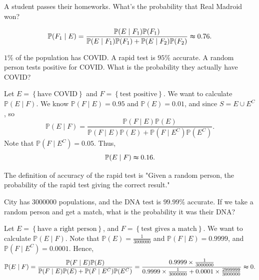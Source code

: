 \begin{eg}
    A student passes their homeworks. What's the probability that Real Madroid won?
\end{eg}
\begin{explanation}
    \begin{align*}
        \mathbb{P} (F_1 \mid E) = \frac{\mathbb{P} (E \mid F_1) \mathbb{P} (F_1)}{\mathbb{P} (E \mid F_1) \mathbb{P} (F_1) + \mathbb{P} (E \mid F_2) \mathbb{P} (F_2) } \thickapprox 0.76.
    \end{align*}
\end{explanation}

\begin{eg}
    \(1 \%\) of the population has COVID. A rapid test is \(95 \%\) accurate. A random person tests positive for COVID. What is the probability they actually have COVID?  
\end{eg}
\begin{explanation}
    Let \(E = \left\{ \text{have COVID}  \right\} \) and \(F = \left\{ \text{test positive}  \right\} \). We want to calculate \(\mathbb{P} (E \mid F)\). We know \(\mathbb{P} (F \mid E) = 0.95\) and \(\mathbb{P} (E) = 0.01\), and since \(S = E \cup E^C\), so 
    \[
        \mathbb{P} (E \mid F) = \frac{\mathbb{P} (F \mid E) \mathbb{P} (E)}{\mathbb{P} (F \mid E) \mathbb{P} (E) + \mathbb{P} (F \mid E^C) \mathbb{P} (E^C) }.
    \]       
    Note that \(\mathbb{P} (F \mid E^C) = 0.05\). Thus,
    \[
        \mathbb{P} (E \mid F) \thickapprox 0.16.
    \] 
\end{explanation}

\begin{remark}
    The definition of accuracy of the rapid test is "Given a random person, the probability of the rapid test giving the correct result."
\end{remark}

\begin{eg}
    City has \(3000000\) populations, and the DNA test is \(99.99\%\) accurate. If we take a random person and get a match, what is the probability it was their DNA? 
\end{eg}

\begin{explanation}
    Let \(E = \left\{ \text{have a right person}  \right\} \), and \(F = \left\{ \text{test gives a match} \right\} \). We want to calculate \(\mathbb{P} (E \mid F)\). Note that \(\mathbb{P} (E) = \frac{1}{3000000}\) and \(\mathbb{P} (F \mid E) = 0.9999\), and \(\mathbb{P} (F \mid E^C) = 0.0001\). Hence,
    \[
        \mathbb{P} (E \mid F) = \frac{\mathbb{P} (F \mid E) \mathbb{P} (E)}{\mathbb{P} (F \mid E) \mathbb{P} (E) + \mathbb{P} (F \mid E^C) \mathbb{P} (E^C)} = \frac{0.9999 \times \frac{1}{3000000}}{0.9999 \times \frac{1}{3000000} + 0.0001 \times \frac{2999999}{3000000}} \thickapprox 0.
    \]     
\end{explanation}

